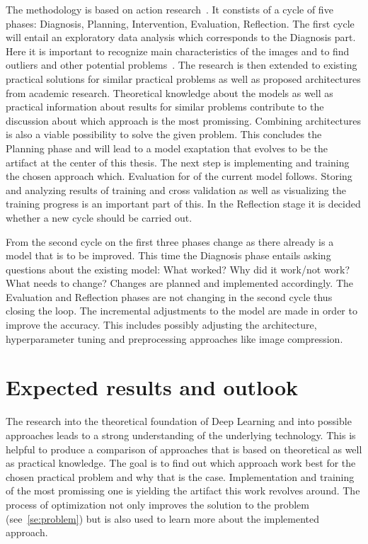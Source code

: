The methodology is based on action research~\cite{johannesson_introduction_2021}.
It constists of a cycle of five phases: Diagnosis, Planning, Intervention, Evaluation, Reflection.
The first cycle will entail an exploratory data analysis which corresponds to the Diagnosis part.
Here it is important to recognize main characteristics of the images and to find outliers
and other potential problems~\cite{cox_translating_2017}.
The research is then extended to existing practical solutions for similar practical problems as
well as proposed architectures from academic research.
Theoretical knowledge about the models as well as practical information about results for
similar problems contribute to the discussion about which approach is the most promissing.
Combining architectures is also a viable possibility to solve the given problem.
This concludes the Planning phase and will lead to a model exaptation that evolves to be the
artifact at the center of this thesis.
The next step is implementing and training the chosen approach which.
Evaluation for of the current model follows.
Storing and analyzing results of training and cross validation as well as visualizing the training
progress is an important part of this.
In the Reflection stage it is decided whether a new cycle should be carried out.

From the second cycle on the first three phases change as there already is a model that is to be
improved.
This time the Diagnosis phase entails asking questions about the existing model: What worked?
Why did it work/not work? What needs to change?
Changes are planned and implemented accordingly.
The Evaluation and Reflection phases are not changing in the second cycle thus closing the loop.
The incremental adjustments to the model are made in order to improve the accuracy.
This includes possibly adjusting the architecture, hyperparameter tuning and preprocessing approaches
like image compression.

\section{Expected results and outlook}
The research into the theoretical foundation of Deep Learning and into possible approaches leads
to a strong understanding of the underlying technology.
This is helpful to produce a comparison of approaches that is based on theoretical as well as
practical knowledge.
The goal is to find out which approach work best for the chosen practical problem and why that is the
case.
Implementation and training of the most promissing one is yielding the artifact this work revolves
around.
The process of optimization not only improves the solution to the problem (see~\ref{se:problem}) but
is also used to learn more about the implemented approach.

